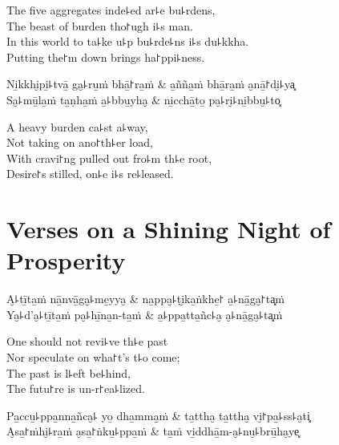 \begin{english}
  The five aggregates inde꜕ed ar꜕e bu꜕rdens,\\
  The beast of burden tho꜓ugh i꜕s man.\\
  In this world to ta꜕ke u꜕p bu꜕rde꜕ns i꜕s du꜕kkha.\\
  Putting the꜓m down brings ha꜓ppi꜕ness.
\end{english}

\begin{twochants}
Ni̱kkhi̮pi̱꜕tvā̱ ga̮꜕ru̱ṁ bhā̱꜓ra̱ṁ & a̱ñña̱ṁ bhā̱ra̱ṁ a̮nā̱꜓di̮꜕ya͓ \\
Sa̮꜕mū̱la̱ṁ ta̱ṇha̱ṁ a̱꜕bbu̱yha̮ & ni̱cchā̱to̱ pa̮꜕ri̮꜕ni̱bbu̮꜕to͓ \\
\end{twochants}

\begin{english}
  A heavy burden ca꜕st a꜕way,\\
  Not taking on ano꜓th꜕er load,\\
  With cravi꜓ng pulled out fro꜕m th꜕e root,\\
  Desire꜓s stilled, on꜕e i꜕s re꜕leased.
\end{english}

\chapter{Verses on a Shining Night of Prosperity}


\begin{leader}
\end{leader}

\begin{twochants}
  A̮꜕tī̱ta̱ṁ nā̱nvā̱ga̮꜕me̱yya̮ & na̱ppa̮꜕ṭi̮ka̱ṅkhe̱꜓ a̮꜕nā̱ga̮꜓ta͓ṁ \\
  Ya̮꜕d'a̮꜕tī̱ta̱ṁ pa̮꜕hī̱na̱n-ta̱ṁ & a̱꜕ppa̱tta̱ñc꜕a̮ a̮꜕nā̱ga̮꜕ta͓ṁ \\
\end{twochants}

\begin{english}
  One should not revi꜕ve th꜕e past\\
  Nor speculate on wha꜓t's t꜕o come;\\
  The past is l꜕eft be꜕hind,\\
  The futu꜓re is un-r꜓ea꜕lized.
\end{english}

\begin{twochants}
  Pa̱ccu̱꜕ppa̱nna̱ñca̮꜕ yo̱ dha̱mma̱ṁ & ta̱ttha̮ ta̱ttha̮ vi̮꜓pa̱꜕ss꜕a̮ti͓ \\
  A̮sa̱꜓ṁhi̮꜕ra̱ṁ a̮sa̱꜓ṅku̱꜕ppa̱ṁ & ta̱ṁ vi̱ddhā̱m-a̮꜕nu̮꜕brū̱ha̮ye͓ \\
\end{twochants}

